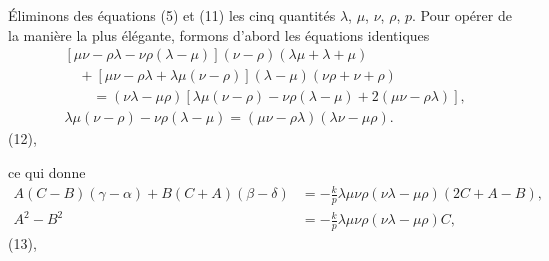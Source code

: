 \documentclass[12pt,a4paper]{article}
\begin{document}
\newpage
\setcounter{page}{189}

\'Eliminons des \'equations (5) et (11) les cinq quantit\'es $\lambda$, $\mu$, $\nu$, $\rho$, $p$. Pour op\'erer de la mani\`ere la plus \'el\'egante, formons d'abord les \'equations identiques
\begin{align*}
&[\mu\nu - \rho\lambda - \nu\rho(\lambda - \mu)](\nu - \rho)(\lambda\mu + \lambda + \mu)\\
&\quad + [\mu\nu - \rho\lambda + \lambda\mu(\nu - \rho)](\lambda - \mu)(\nu\rho + \nu + \rho)\\
&\qquad = (\nu\lambda - \mu\rho)[\lambda\mu(\nu - \rho) - \nu\rho(\lambda - \mu) + 2(\mu\nu - \rho\lambda)],\\
&\lambda\mu(\nu - \rho) - \nu\rho(\lambda - \mu) = (\mu\nu - \rho\lambda)(\lambda\nu - \mu\rho).
\end{align*}
\hfill (12),

\noindent ce qui donne
\begin{align*}
A(C - B)(\gamma - \alpha) + B(C + A)(\beta - \delta) &= -\tfrac{k}{p}\lambda\mu\nu\rho(\nu\lambda - \mu\rho)(2C + A - B),\\
A^2 - B^2 &= -\tfrac{k}{p}\lambda\mu\nu\rho(\nu\lambda - \mu\rho)C,
\end{align*}
\hfill (13),
\end{document}
